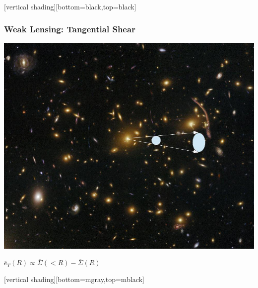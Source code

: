 \documentclass{beamer}
\begin{document}
{
    [vertical shading][bottom=black,top=black]
	
    \frame
    {
        \frametitle{Weak Lensing: Tangential Shear}
            
            \begin{minipage}{\linewidth}
                \begin{center}
                    \includegraphics[height=0.6\textheight]{shear-illustration-nowhite.jpg}
                \end{center}
            \end{minipage}

            \begin{minipage}{\linewidth}
                \begin{center}
                    {\color{gold}
                        {\huge
                            $\overline{e}_{T}(R) \propto \overline{\Sigma}(<R) - \overline{\Sigma}(R)$
                        }
                    }
                \end{center}
            \end{minipage}

    }


    [vertical shading][bottom=mgray,top=mblack]

}
\end{document}

